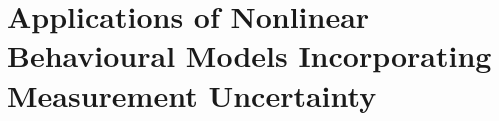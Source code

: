 \documentclass[../thesis.tex]{subfiles}
\begin{document}
\chapter{Applications of Nonlinear Behavioural Models Incorporating Measurement Uncertainty}
\end{document}

